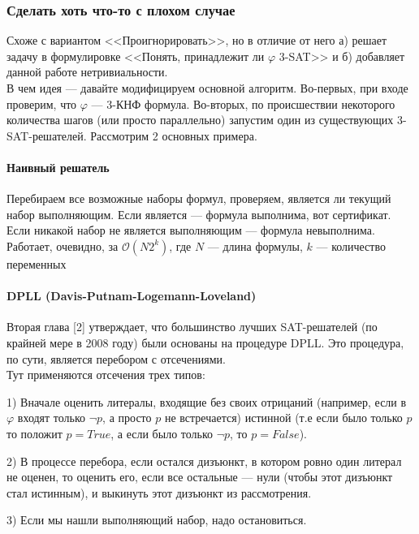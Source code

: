 \documentclass[paper=a4, fontsize=11pt]{scrartcl}
\begin{document}
\subsubsection{Сделать хоть что-то с плохом случае}

Схоже с вариантом <<Проигнорировать>>, но в отличие от него а) решает задачу
в формулировке <<Понять, принадлежит ли $\varphi$ 3-SAT>> и б) добавляет данной
работе нетривиальности. \\

В чем идея --- давайте модифицируем основной алгоритм. Во-первых, при входе
проверим, что $\varphi$ --- 3-КНФ формула. Во-вторых, по происшествии некоторого
количества шагов (или просто параллельно) запустим один из
существующих 3-SAT-решателей. Рассмотрим 2 основных примера.\\


\paragraph{Наивный решатель}

Перебираем все возможные наборы формул, проверяем, является ли текущий набор
выполняющим. Если является --- формула выполнима, вот сертификат. Если никакой
набор не является выполняющим --- формула невыполнима. Работает, очевидно,
за $\mathcal{O}(N2^k)$, где $N$ --- длина формулы, $k$ ---
количество переменных\\


\paragraph{DPLL (Davis-Putnam-Logemann-Loveland)}
Вторая глава [2] утверждает, что большинство лучших SAT-решателей (по крайней
мере в 2008 году) были основаны на процедуре DPLL. Это процедура, по сути,
является перебором с отсечениями. \\

Тут применяются отсечения трех типов:

1) Вначале оценить литералы, входящие без
своих отрицаний (например, если в $\varphi$ входят только $\neg p$, а просто
$p$ не встречается) истинной (т.е если было только $p$ то положит $p=True$, а
если было только $\neg p$, то $p=False$).

2) В процессе перебора, если остался дизъюнкт, в котором ровно один литерал
не оценен, то оценить его, если все остальные --- нули (чтобы этот дизъюнкт
стал истинным), и выкинуть этот дизъюнкт из рассмотрения.

3) Если мы нашли выполняющий набор, надо остановиться.
\end{document}
